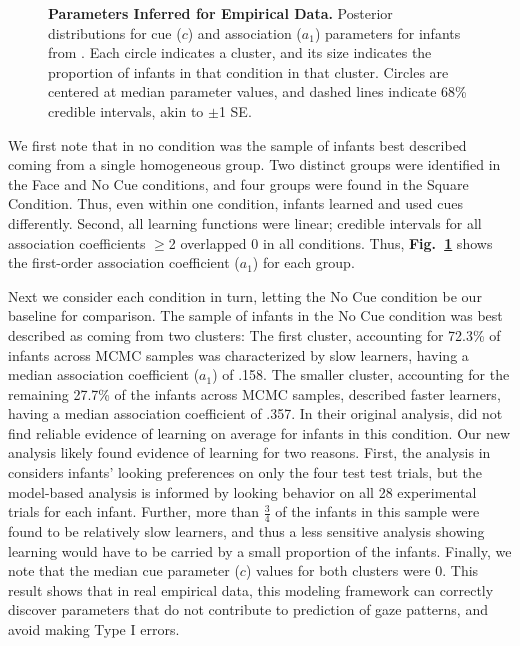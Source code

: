 \documentclass[12pt]{article}
\begin{document}
\begin{figure}[!b]
\caption{\textbf{Parameters Inferred for Empirical Data.} Posterior distributions for cue ($c$) and association ($a_{1}$) parameters for infants from \cite{Wu2010a}. Each circle indicates a cluster, and its size indicates the proportion of infants in that condition in that cluster. Circles are centered at median parameter values, and dashed lines indicate 68\% credible intervals, akin to $\pm$1 SE.}
\label{fig:exp}
\end{figure}

	We first note that in no condition was the sample of infants best described coming from a single homogeneous group. Two distinct groups were identified in the Face and No Cue conditions, and four groups were found in the Square Condition. Thus, even within one condition, infants learned and used cues differently. Second, all learning functions were linear; credible intervals for all association coefficients $\geq$2 overlapped 0 in all conditions. Thus, \textbf{Fig.~\ref{fig:exp}} shows the first-order association coefficient ($a_{1}$) for each group. 

	Next we consider each condition in turn, letting the No Cue condition be our baseline for comparison. The sample of infants in the No Cue condition was best described as coming from two clusters: The first cluster, accounting for 72.3\% of infants across MCMC samples was characterized by slow learners, having a median association coefficient ($a_{1}$) of .158. The smaller cluster, accounting for the remaining 27.7\% of the infants across MCMC samples, described faster learners, having a median association coefficient of .357. In their original analysis, \cite{Wu2010a} did not find reliable evidence of learning on average for infants in this condition. Our new analysis likely found evidence of learning for two reasons. First, the analysis in \cite{Wu2010a} considers infants' looking preferences on only the four test test trials, but the model-based analysis is informed by looking behavior on all 28 experimental trials for each infant. Further, more than $\frac{3}{4}$ of the infants in this sample were found to be relatively slow learners, and thus a less sensitive analysis showing learning would have to be carried by a small proportion of the infants. Finally, we note that the median cue parameter ($c$) values for both clusters were 0. This result shows that in real empirical data, this modeling framework can correctly discover parameters that do not contribute to prediction of gaze patterns, and avoid making Type I errors.
\end{document}
